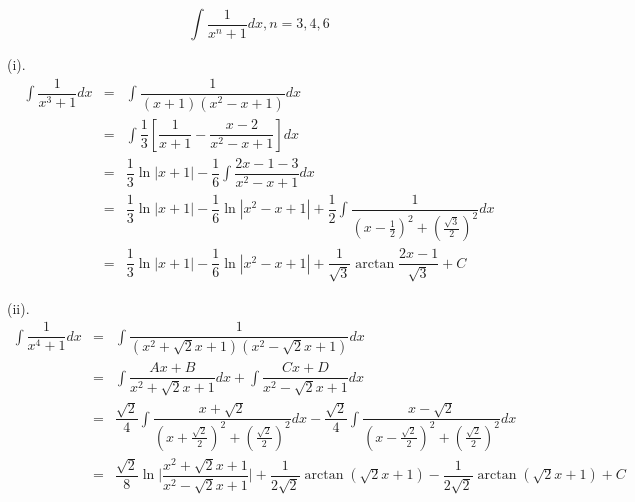 \begin{corollary}[扩展不定积分]
	\begin{proposition}
		$$\int \dfrac{1}{x^{n}+1} dx, n = 3,4,6$$
	\end{proposition}

	\begin{solution}

		(i). 
		\begin{eqnarray*}
			\int \dfrac{1}{x^{3}+1} dx & = & \int \dfrac{1}{(x+1)(x^{2}-x+1)} dx\\
			                           & = & \int \dfrac{1}{3}\left[\dfrac{1}{x+1} - \dfrac{x-2}{x^{2}-x+1}\right]dx\\
			                           & = & \dfrac{1}{3}\ln |x+1| -\dfrac{1}{6}\int \dfrac{2x-1-3}{x^{2}-x+1}dx\\
			                           & = & \dfrac{1}{3}\ln |x+1| -\dfrac{1}{6}\ln |x^{2}-x+1| +\dfrac{1}{2}\int \dfrac{1}{(x-\frac{1}{2})^{2}+(\frac{\sqrt{3}}{2})^{2}}dx\\
									   & = & \dfrac{1}{3}\ln |x+1| -\dfrac{1}{6}\ln |x^{2}-x+1| +\dfrac{1}{\sqrt{3}}\arctan \dfrac{2x-1}{\sqrt{3}}+C
		\end{eqnarray*}

		(ii). 
		\begin{eqnarray*}
			\int \dfrac{1}{x^{4}+1} dx & = & \int \dfrac{1}{(x^{2}+\sqrt{2}x+1)(x^{2}-\sqrt{2}x+1)} dx\\
			                           & = & \int \dfrac{Ax+B}{x^{2}+\sqrt{2}x+1}dx + \int\dfrac{Cx+D}{x^{2}-\sqrt{2}x+1}dx\\
			                           & = & \dfrac{\sqrt{2}}{4}\int \dfrac{x+\sqrt{2}}{(x+\frac{\sqrt{2}}{2})^{2}+(\frac{\sqrt{2}}{2})^{2}}dx -\dfrac{\sqrt{2}}{4}\int \dfrac{x-\sqrt{2}}{(x-\frac{\sqrt{2}}{2})^{2}+(\frac{\sqrt{2}}{2})^{2}}dx\\
			                           & = & \dfrac{\sqrt{2}}{8}\ln \big|\dfrac{x^{2}+\sqrt{2}x+1}{x^{2}-\sqrt{2}x+1}\big| +\dfrac{1}{2\sqrt{2}}\arctan (\sqrt{2}x+1) -\dfrac{1}{2\sqrt{2}}\arctan (\sqrt{2}x+1) +C\\
		\end{eqnarray*}


\end{solution}
\end{corollary}
